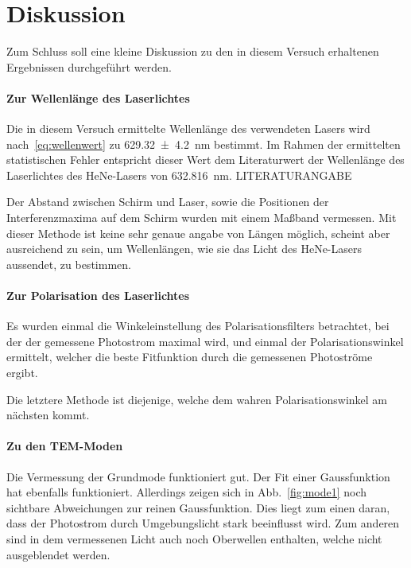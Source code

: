 
\section{Diskussion}
Zum Schluss soll eine kleine Diskussion zu den in diesem Versuch
erhaltenen Ergebnissen durchgeführt werden.

\paragraph{Zur Wellenlänge des Laserlichtes}

Die in diesem Versuch ermittelte Wellenlänge des verwendeten 
Lasers wird nach~\eqref{eq:wellenwert} zu  
\SI{629.32(420)}{\nano\metre} bestimmt. Im Rahmen der 
ermittelten statistischen Fehler entspricht dieser Wert dem 
Literaturwert der Wellenlänge des Laserlichtes des HeNe-Lasers 
von \SI{632.816}{\nano\metre}.
LITERATURANGABE

Der Abstand zwischen Schirm und Laser, sowie die Positionen der 
Interferenzmaxima auf dem Schirm wurden mit einem Maßband 
vermessen. Mit dieser Methode ist keine sehr genaue angabe von 
Längen möglich, scheint aber ausreichend zu sein, um Wellenlängen, 
wie sie das Licht des HeNe-Lasers aussendet, zu bestimmen.

\paragraph{Zur Polarisation des Laserlichtes}

Es wurden einmal die Winkeleinstellung des Polarisationsfilters 
betrachtet, bei der der gemessene Photostrom maximal wird, 
und einmal der Polarisationswinkel ermittelt, welcher die beste 
Fitfunktion durch die gemessenen Photoströme ergibt. 

Die letztere Methode ist diejenige, welche dem wahren 
Polarisationswinkel am nächsten kommt. 

\paragraph{Zu den TEM-Moden}

Die Vermessung der Grundmode funktioniert gut. 
Der Fit einer Gaussfunktion hat ebenfalls funktioniert. 
Allerdings zeigen sich in Abb.~\ref{fig:mode1} noch 
sichtbare Abweichungen zur reinen Gaussfunktion. 
Dies liegt zum einen daran, dass der Photostrom durch 
Umgebungslicht stark beeinflusst wird.
Zum anderen sind in dem vermessenen Licht auch noch 
Oberwellen enthalten, welche nicht ausgeblendet werden. 

